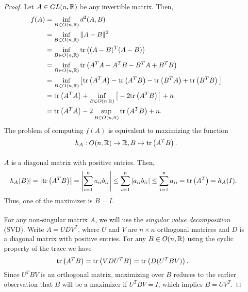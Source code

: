 \begin{proof}
 Let $A\in GL(n,\mathbb{R})$ be any invertible matrix. Then,
\begin{align}
    f(A) & =  \inf_{B\in O(n,\mathbb{R})}d^2(A,B)\nonumber
    \\
         & =  \inf_{B\in O(n,\mathbb{R})} \|A-B\|^2\nonumber
         \\
         & =  \inf_{B\in O(n,\mathbb{R})} \mathrm{tr}\left( (A-B)^T(A-B) \right)\nonumber
         \\
         & =  \inf_{B\in O(n,\mathbb{R})} \mathrm{tr}\left( A^TA-A^TB-B^TA+B^TB \right)\nonumber
         \\
         & =  \inf_{B\in O(n,\mathbb{R})} \big[\mathrm{tr}\left( A^TA \right)-\mathrm{tr}\left( A^TB \right)-\mathrm{tr}\left( B^TA \right)+\mathrm{tr}\left( B^TB \right) \big]\nonumber
         \\
         & =  \mathrm{tr}\left( A^TA \right) + \inf_{B\in O(n,\mathbb{R})}\big[- 2\mathrm{tr}\left( A^TB \right) \big] + n \nonumber
         \\
         & =  \mathrm{tr}\left( A^TA \right) -2\sup_{B\in O(n,\mathbb{R})} \mathrm{tr}\left( A^TB \right) + n.  \label{maxdist}
\end{align}
The problem of computing $f(A)$ is equivalent to maximizing the function
\begin{displaymath}
    h_A: O(n,\mathbb{R})\to \mathbb{R}, B\mapsto \mathrm{tr}\left( A^TB \right).
\end{displaymath} 
\paragraph{} $A$ is a diagonal matrix with positive entries. Then, 
\begin{align*}
    \left|h_A(B)\right|  = \left|\mathrm{tr}\left( A^TB \right)\right|
     = \left|\sum_{i=1}^n a_{ii} b_{ii} \right| 
     \le \sum_{i=1}^n \left|a_{ii}b_{ii}\right|
      & \le \sum_{i=1}^n a_{ii}
    = \mathrm{tr}\left( A^T \right) 
    = h_A(I).
\end{align*}
Thus, one of the maximizer is $B=I.$
\paragraph{}  For any non-singular matrix $A$, we will use the \textit{singular value decomposition} (SVD).  Write $A=UDV^T$, where $U$ and $V$ are $n\times n$ orthogonal matrices and $D$ is a diagonal matrix with positive entries. For any $B\in O(n,\mathbb{R})$ using the cyclic property of the trace we have
\begin{align}
    \mathrm{tr}\left( A^TB \right)  & = \mathrm{tr}\left( VDU^TB \right) = \mathrm{tr}\left( D(U^TBV) \right).
\end{align}
Since $U^TBV$ is an orthogonal matrix, maximizing over $B$ reduces to the earlier observation that $B$ will be a maximizer if $U^TBV = I$, which implies $B = UV^T$. 


\end{proof}

